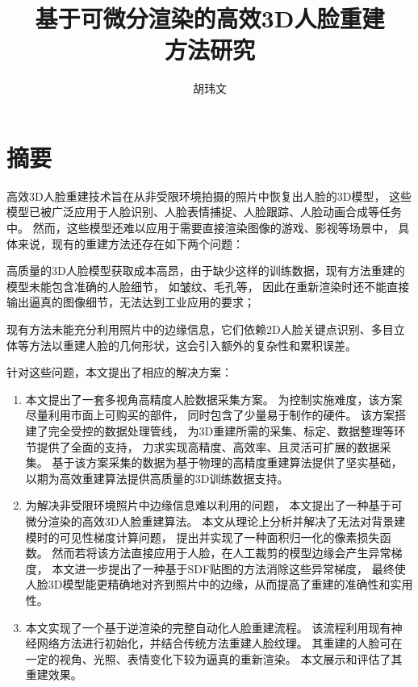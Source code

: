 \documentclass{scutmaster}
\title{基于可微分渲染的高效3D人脸重建\texorpdfstring{\\}{}方法研究}
\author{胡玮文}
\begin{document}
\maketitle
\hideinblind{
    \maketitleEN
    \nominationpage
    \declareoforiginality
}

\frontmatter
\chapter{摘\texorpdfstring{\quad}{}要}

高效3D人脸重建技术旨在从非受限环境拍摄的照片中恢复出人脸的3D模型，
这些模型已被广泛应用于人脸识别、人脸表情捕捉、人脸跟踪、人脸动画合成等任务中。
然而，这些模型还难以应用于需要直接渲染图像的游戏、影视等场景中，
具体来说，现有的重建方法还存在如下两个问题：
\begin{enumerate*}
\item 高质量的3D人脸模型获取成本高昂，由于缺少这样的训练数据，现有方法重建的模型未能包含准确的人脸细节，
如皱纹、毛孔等，
因此在重新渲染时还不能直接输出逼真的图像细节，无法达到工业应用的要求；
\item 现有方法未能充分利用照片中的边缘信息，它们依赖2D人脸关键点识别、多目立体等方法以重建人脸的几何形状，这会引入额外的复杂性和累积误差。
\end{enumerate*}

针对这些问题，本文提出了相应的解决方案：
\begin{enumerate}
\item 本文提出了一套多视角高精度人脸数据采集方案。
为控制实施难度，该方案尽量利用市面上可购买的部件，
同时包含了少量易于制作的硬件。
该方案搭建了完全受控的数据处理管线，
为3D重建所需的采集、标定、数据整理等环节提供了全面的支持，
力求实现高精度、高效率、且灵活可扩展的数据采集。
基于该方案采集的数据为基于物理的高精度重建算法提供了坚实基础，以期为高效重建算法提供高质量的3D训练数据支持。
\item 为解决非受限环境照片中边缘信息难以利用的问题，
本文提出了一种基于可微分渲染的高效3D人脸重建算法。
本文从理论上分析并解决了无法对背景建模时的可见性梯度计算问题，
提出并实现了一种面积归一化的像素损失函数。
然而若将该方法直接应用于人脸，在人工裁剪的模型边缘会产生异常梯度，
本文进一步提出了一种基于SDF贴图的方法消除这些异常梯度，
最终使人脸3D模型能更精确地对齐到照片中的边缘，从而提高了重建的准确性和实用性。
\item 本文实现了一个基于逆渲染的完整自动化人脸重建流程。
该流程利用现有神经网络方法进行初始化，并结合传统方法重建人脸纹理。
其重建的人脸可在一定的视角、光照、表情变化下较为逼真的重新渲染。
本文展示和评估了其重建效果。
\end{enumerate}
\end{document}

